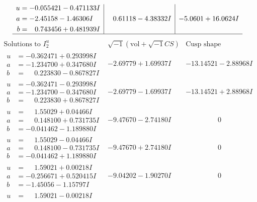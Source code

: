 \documentclass[1p]{elsarticle_modified}
\theoremstyle{definition}
\newcommand{\I}{\sqrt{-1}}
\begin{document}
$$\begin{array}{c|c|c}
\begin{aligned}
u &= -0.055421 - 0.471133 I \\
a &= -2.45158 - 1.46306 I \\
b &= \phantom{-}0.743456 + 0.481939 I\end{aligned}
 & \phantom{-}0.61118 - 4.38332 I & -5.0601 + 16.0624 I\\
 \hline 
 \end{array}$$\newpage$$\begin{array}{c|c|c}  
\text{Solutions to }I^u_{2}& \I (\text{vol} + \sqrt{-1}CS) & \text{Cusp shape}\\
 \hline 
\begin{aligned}
u &= -0.362471 + 0.293998 I \\
a &= -1.234700 + 0.347680 I \\
b &= \phantom{-}0.223830 - 0.867827 I\end{aligned}
 & -2.69779 + 1.69937 I & -13.14521 - 2.88968 I \\ \hline\begin{aligned}
u &= -0.362471 - 0.293998 I \\
a &= -1.234700 - 0.347680 I \\
b &= \phantom{-}0.223830 + 0.867827 I\end{aligned}
 & -2.69779 - 1.69937 I & -13.14521 + 2.88968 I \\ \hline\begin{aligned}
u &= \phantom{-}1.55029 + 0.04466 I \\
a &= \phantom{-}0.148100 + 0.731735 I \\
b &= -0.041462 - 1.189880 I\end{aligned}
 & -9.47670 - 2.74180 I & \phantom{-0.000000 } 0 \\ \hline\begin{aligned}
u &= \phantom{-}1.55029 - 0.04466 I \\
a &= \phantom{-}0.148100 - 0.731735 I \\
b &= -0.041462 + 1.189880 I\end{aligned}
 & -9.47670 + 2.74180 I & \phantom{-0.000000 } 0 \\ \hline\begin{aligned}
u &= \phantom{-}1.59021 + 0.00218 I \\
a &= -0.256671 + 0.520415 I \\
b &= -1.45056 - 1.15797 I\end{aligned}
 & -9.04202 - 1.90270 I & \phantom{-0.000000 } 0 \\ \hline\begin{aligned}
u &= \phantom{-}1.59021 - 0.00218 I \\

\end{aligned}
\end{array}$$
\end{document}
